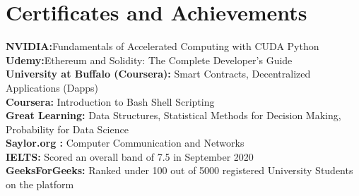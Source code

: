 \documentclass[letterpaper,11pt]{article}
\begin{document}
 \section{Certificates and Achievements}
 \begin{itemize}[leftmargin=0.15in, label={}]
    \small{\item{
     \textbf{NVIDIA:}{Fundamentals of Accelerated Computing with CUDA Python} \\
     \textbf{Udemy:}{Ethereum and Solidity: The Complete Developer's Guide} \\
     \textbf{University at Buffalo (Coursera):}{ Smart Contracts, Decentralized Applications (Dapps)} \\
     \textbf{Coursera:}{ Introduction to Bash Shell Scripting} \\
     \textbf{Great Learning:}{ Data Structures, Statistical Methods for Decision Making, Probability for Data Science} \\
     \textbf{Saylor.org :}{ Computer Communication and Networks} \\
     \textbf{IELTS: }{Scored an overall band of 7.5 in September 2020} \\
     \textbf{GeeksForGeeks: }{Ranked under 100 out of 5000 registered University Students on the platform}
    }}
 \end{itemize}


 

\end{document}
